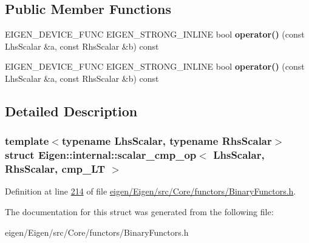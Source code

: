 \subsection*{Public Member Functions}
\begin{DoxyCompactItemize}
\item 
\mbox{\label{struct_eigen_1_1internal_1_1scalar__cmp__op_3_01_lhs_scalar_00_01_rhs_scalar_00_01cmp___l_t_01_4_af196a5720aba4bafc0681d66be2061f6}} 
E\+I\+G\+E\+N\+\_\+\+D\+E\+V\+I\+C\+E\+\_\+\+F\+U\+NC E\+I\+G\+E\+N\+\_\+\+S\+T\+R\+O\+N\+G\+\_\+\+I\+N\+L\+I\+NE bool {\bfseries operator()} (const Lhs\+Scalar \&a, const Rhs\+Scalar \&b) const
\item 
\mbox{\label{struct_eigen_1_1internal_1_1scalar__cmp__op_3_01_lhs_scalar_00_01_rhs_scalar_00_01cmp___l_t_01_4_af196a5720aba4bafc0681d66be2061f6}} 
E\+I\+G\+E\+N\+\_\+\+D\+E\+V\+I\+C\+E\+\_\+\+F\+U\+NC E\+I\+G\+E\+N\+\_\+\+S\+T\+R\+O\+N\+G\+\_\+\+I\+N\+L\+I\+NE bool {\bfseries operator()} (const Lhs\+Scalar \&a, const Rhs\+Scalar \&b) const
\end{DoxyCompactItemize}


\subsection{Detailed Description}
\subsubsection*{template$<$typename Lhs\+Scalar, typename Rhs\+Scalar$>$\newline
struct Eigen\+::internal\+::scalar\+\_\+cmp\+\_\+op$<$ Lhs\+Scalar, Rhs\+Scalar, cmp\+\_\+\+L\+T $>$}



Definition at line \hyperlink{eigen_2_eigen_2src_2_core_2functors_2_binary_functors_8h_source_l00214}{214} of file \hyperlink{eigen_2_eigen_2src_2_core_2functors_2_binary_functors_8h_source}{eigen/\+Eigen/src/\+Core/functors/\+Binary\+Functors.\+h}.



The documentation for this struct was generated from the following file\+:\begin{DoxyCompactItemize}
\item 
eigen/\+Eigen/src/\+Core/functors/\+Binary\+Functors.\+h\end{DoxyCompactItemize}
